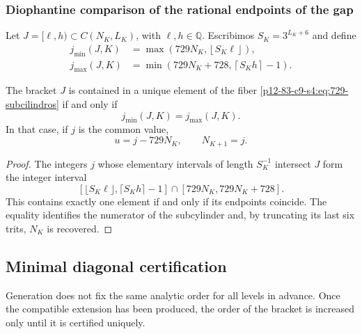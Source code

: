 \subsubsection{Diophantine comparison of the rational endpoints of the gap}

Let \(J=[\ell,h)\subset C(N_K,L_K)\), with
\(\ell,h\in\mathbb Q\). Escribimos \(S_K=3^{L_K+6}\) and define
\begin{align}
 j_{\min}(J,K)
 &=\max\!\left(729N_K,\left\lfloor S_K\ell\right\rfloor\right),
 \label{p12-83-c9-s4:eq:jmin-diagonal}\\
 j_{\max}(J,K)
 &=\min\!\left(729N_K+728,\left\lceil S_Kh\right\rceil-1\right).
 \label{p12-83-c9-s4:eq:jmax-diagonal}
\end{align}

\begin{lemma}
\label{p12-83-c9-s4:lem:criterio-localizacion-unitaria}
The bracket \(J\) is contained in a unique element of the fiber
\eqref{p12-83-c9-s4:eq:729-subcilindros} if and only if
\begin{equation}
 \boxed{j_{\min}(J,K)=j_{\max}(J,K).}
 \label{p12-83-c9-s4:eq:jmin-igual-jmax}
\end{equation}
In that case, if \(j\) is the common value,
\[
 u=j-729N_K,
 \qquad
 N_{K+1}=j.
\]
\end{lemma}

\begin{proof}
The integers \(j\) whose elementary intervals of length \(S_K^{-1}\)
intersect \(J\) form the integer interval
\[
 \left[
 \lfloor S_K\ell\rfloor,
 \lceil S_Kh\rceil-1
 \right]\cap
 [729N_K,729N_K+728].
\]
This contains exactly one element if and only if its endpoints coincide.
The equality identifies the numerator of the subcylinder and, by truncating its last
six trits, \(N_K\) is recovered.
\end{proof}

\subsection{Minimal diagonal certification}

Generation does not fix the same analytic order for all
levels in advance. Once the compatible extension has been produced, the order of the
bracket is increased only until it is certified uniquely.

